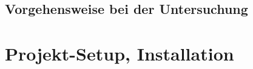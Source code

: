 \documentclass[a4paper, 12pt, hidelinks, listof=totoc, listoftables=totoc, bibliography=totoc]{scrreprt}
\begin{document}

\section{Vorgehensweise bei der Untersuchung}



\chapter{Projekt-Setup, Installation}
\end{document}
